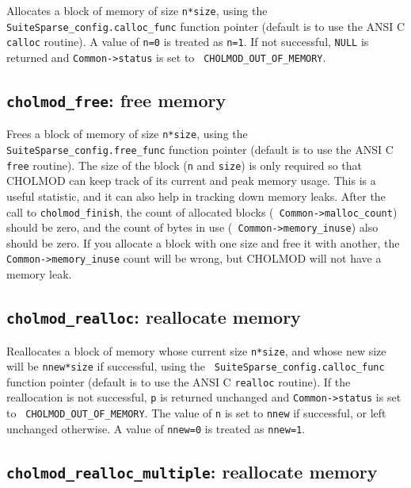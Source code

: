 \documentclass[11pt]{article}
\begin{document}

Allocates a block of memory of size {\tt n*size}, using the {\tt
SuiteSparse\_config.calloc\_func} function pointer (default is to use the ANSI
C {\tt calloc} routine).  A value of {\tt n=0} is treated as {\tt n=1}.  If not
successful, {\tt NULL} is returned and {\tt Common->status} is set to {\tt
CHOLMOD\_OUT\_OF\_MEMORY}.

\subsection{{\tt cholmod\_free}: free memory}


Frees a block of memory of size {\tt n*size}, using the {\tt
SuiteSparse\_config.free\_func} function pointer (default is to use the ANSI C
{\tt free} routine).  The size of the block ({\tt n} and {\tt size}) is only
required so that CHOLMOD can keep track of its current and peak memory usage.
This is a useful statistic, and it can also help in tracking down memory leaks.
After the call to {\tt cholmod\_finish}, the count of allocated blocks ({\tt
Common->malloc\_count}) should be zero, and the count of bytes in use ({\tt
Common->memory\_inuse}) also should be zero.  If you allocate a block with one
size and free it with another, the {\tt Common->memory\_inuse} count will be
wrong, but CHOLMOD will not have a memory leak.

\subsection{{\tt cholmod\_realloc}: reallocate memory}


Reallocates a block of memory whose current size {\tt n*size}, and whose new
size will be {\tt nnew*size} if successful, using the {\tt
SuiteSparse\_config.calloc\_func} function pointer (default is to use the ANSI
C {\tt realloc} routine).  If the reallocation is not successful, {\tt p} is
returned unchanged and {\tt Common->status} is set to {\tt
CHOLMOD\_OUT\_OF\_MEMORY}.  The value of {\tt n} is set to {\tt nnew} if
successful, or left unchanged otherwise.  A value of {\tt nnew=0} is treated as
{\tt nnew=1}.

\subsection{{\tt cholmod\_realloc\_multiple}: reallocate memory}
\end{document}
